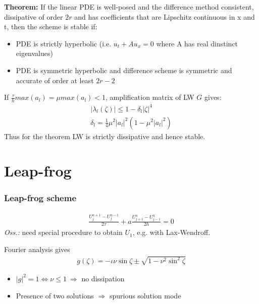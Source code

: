 \documentclass{beamer}
\begin{document}
\begin{frame}
\textbf{Theorem:} If the linear PDE is well-posed and the difference method consistent, dissipative of order $2r$ and has coefficients that are Lipschitz continuous in x and t, then the scheme is stable if:
\begin{itemize}
\setlength\itemsep{1em}
\item PDE is strictly hyperbolic (i.e. $u_t + Au_x = 0$ where A has real dinstinct eigenvalues)
\item PDE is symmetric hyperbolic and difference scheme is symmetric and accurate of order at least $2r- 2$
\end{itemize}
If $\frac{\tau}{h}max(a_l) = \mu max(a_l) < 1$, amplification matrix of LW $G$ gives:
\begin{align*}
|\lambda_l(\zeta)| \leq 1- \delta_l|\zeta|^4 \\
\delta_l = \frac{1}{4}\mu^2|a_l|^2(1-\mu^2|a_l|^2)
\end{align*}
Thus for the theorem LW is strictly dissipative and hence stable. \cite{doi:10.1137/1.9780898718911}
\end{frame}
\section{Leap-frog}
\begin{frame}
\frametitle{Leap-frog scheme}
\begin{align*}
\frac{U_j^{n+1} - U_j^{n-1}}{2\tau} + a \frac{U_{j+1}^n-U_{j-1}^n}{2h} = 0
\end{align*}
\textit{Oss.:} need special procedure to obtain $U_1$, e.g. with Lax-Wendroff.
\end{frame}
\begin{frame}
Fourier analysis gives
\begin{align*}
g(\zeta) = -\iota\nu\sin{\zeta} \pm \sqrt{1 - \nu^2\sin^2{\zeta}}
\end{align*}
\begin{itemize}
\setlength\itemsep{1em}
\item $|g|^2 = 1 \iff \nu \leq 1 \ \Rightarrow$ no dissipation
\item Presence of two solutions $\Rightarrow$ spurious solution mode
\end{itemize}
\end{frame}
\end{document}
